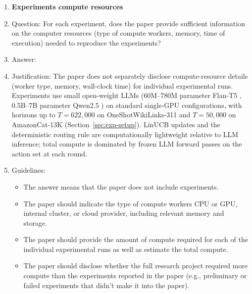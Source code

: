 \documentclass{article}
\theoremstyle{definition}
\theoremstyle{remark}
\theoremstyle{remark}
\begin{document}
\begin{enumerate}
\begin{itemize}
        \item It should be clear whether the error bar is the standard deviation or the standard error of the mean.
        \item It is OK to report 1-sigma error bars, but one should state it. The authors should preferably report a 2-sigma error bar than state that they have a 96\% CI, if the hypothesis of Normality of errors is not verified.
        \item For asymmetric distributions, the authors should be careful not to show in tables or figures symmetric error bars that would yield results that are out of range (e.g., negative error rates).
        \item If error bars are reported in tables or plots, the authors should explain in the text how they were calculated and reference the corresponding figures or tables in the text.
    \end{itemize}

\item {\bf Experiments compute resources}
    \item[] Question: For each experiment, does the paper provide sufficient information on the computer resources (type of compute workers, memory, time of execution) needed to reproduce the experiments?
    \item[] Answer: \answerNo{} %
    \item[] Justification: The paper does not separately disclose compute-resource details (worker type, memory, wall-clock time) for individual experimental runs. Experiments use small open-weight LLMs (60M--780M parameter Flan-T5 \cite{chung2024scaling}, 0.5B--7B parameter Qwen2.5 \cite{hui2024qwen2}) on standard single-GPU configurations, with horizons up to $T=622{,}000$ on OneShotWikiLinks-311 and $T=50{,}000$ on AmazonCat-13K (Section~\ref{sec:exp-setup}). LinUCB updates and the deterministic routing rule are computationally lightweight relative to LLM inference; total compute is dominated by frozen LLM forward passes on the action set at each round.
    \item[] Guidelines:
    \begin{itemize}
        \item The answer \answerNA{} means that the paper does not include experiments.
        \item The paper should indicate the type of compute workers CPU or GPU, internal cluster, or cloud provider, including relevant memory and storage.
        \item The paper should provide the amount of compute required for each of the individual experimental runs as well as estimate the total compute. 
        \item The paper should disclose whether the full research project required more compute than the experiments reported in the paper (e.g., preliminary or failed experiments that didn't make it into the paper). 
    \end{itemize}
    

\end{enumerate}
\end{document}
